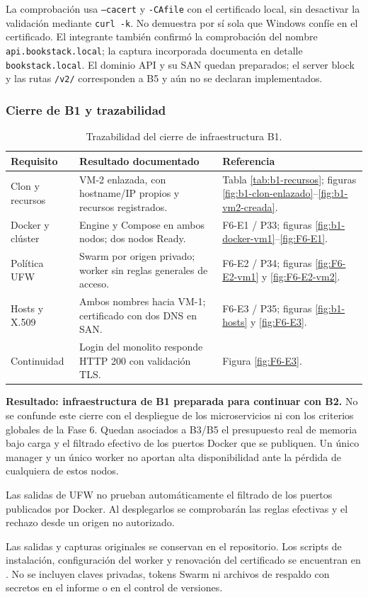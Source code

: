 \begin{sloppypar}
La comprobación usa \texttt{--cacert} y \texttt{-CAfile} con el certificado
local, sin desactivar la validación mediante \texttt{curl -k}. No demuestra
por sí sola que Windows confíe en el certificado. El integrante también
confirmó la comprobación del nombre \texttt{api.bookstack.local}; la captura
incorporada documenta en detalle \texttt{bookstack.local}. El dominio API
y su SAN quedan preparados; el server block y las rutas \texttt{/v2/}
corresponden a B5 y aún no se declaran implementados.
\end{sloppypar}

\clearpage
\subsubsection{Cierre de B1 y trazabilidad}
\begin{table}[H]
\centering\small
\begin{tabularx}{\textwidth}{>{\raggedright\arraybackslash}p{2.2cm}X>{\raggedright\arraybackslash}p{3cm}}
\toprule
\textbf{Requisito} & \textbf{Resultado documentado} & \textbf{Referencia} \\
\midrule
Clon y recursos & VM-2 enlazada, con hostname/IP propios y recursos registrados. & Tabla \ref{tab:b1-recursos}; figuras \ref{fig:b1-clon-enlazado}--\ref{fig:b1-vm2-creada}. \\
Docker y clúster & Engine y Compose en ambos nodos; dos nodos Ready. & F6-E1 / P33; figuras \ref{fig:b1-docker-vm1}--\ref{fig:F6-E1}. \\
Política UFW & Swarm por origen privado; worker sin reglas generales de acceso. & F6-E2 / P34; figuras \ref{fig:F6-E2-vm1} y \ref{fig:F6-E2-vm2}. \\
Hosts y X.509 & Ambos nombres hacia VM-1; certificado con dos DNS en SAN. & F6-E3 / P35; figuras \ref{fig:b1-hosts} y \ref{fig:F6-E3}. \\
Continuidad & Login del monolito responde HTTP 200 con validación TLS. & Figura \ref{fig:F6-E3}. \\
\bottomrule
\end{tabularx}
\caption{Trazabilidad del cierre de infraestructura B1.}
\label{tab:b1-cierre}
\end{table}

\textbf{Resultado: infraestructura de B1 preparada para continuar con B2.}
No se confunde este cierre con el despliegue de los microservicios ni con
los criterios globales de la Fase 6. Quedan asociados a B3/B5 el presupuesto
real de memoria bajo carga y el filtrado efectivo de los puertos Docker
que se publiquen. Un único manager y un único worker no aportan alta
disponibilidad ante la pérdida de cualquiera de estos nodos.

Las salidas de UFW no prueban automáticamente el filtrado de los puertos
publicados por Docker. Al desplegarlos se comprobarán las reglas efectivas
y el rechazo desde un origen no autorizado.

Las salidas y capturas originales se conservan en el repositorio. Los
scripts de instalación, configuración del worker y renovación del
certificado se encuentran en . No se incluyen
claves privadas, tokens Swarm ni archivos de respaldo con secretos en el
informe o en el control de versiones.
